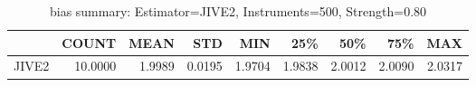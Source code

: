 \begin{table}[ht]
\centering
\caption{bias summary: Estimator=JIVE2, Instruments=500, Strength=0.80}
\begin{tabular}{lrrrrrrrr}
\toprule
 & COUNT & MEAN & STD & MIN & 25\% & 50\% & 75\% & MAX \\
\midrule
JIVE2 & 10.0000 & 1.9989 & 0.0195 & 1.9704 & 1.9838 & 2.0012 & 2.0090 & 2.0317 \\
\bottomrule
\end{tabular}
\end{table}
